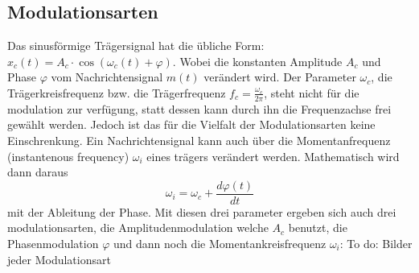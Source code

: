 %
%
%
\subsection{Modulationsarten\label{fm:section:modulation}}

Das sinusförmige Trägersignal hat die übliche Form: 
\(x_c(t) = A_c \cdot \cos(\omega_c(t)+\varphi)\).
Wobei die konstanten Amplitude \(A_c\) und Phase \(\varphi\) vom Nachrichtensignal \(m(t)\) verändert wird.
Der Parameter \(\omega_c\), die Trägerkreisfrequenz bzw. die Trägerfrequenz \(f_c = \frac{\omega_c}{2\pi}\),
steht nicht für die modulation zur verfügung, statt dessen kann durch ihn die Frequenzachse frei gewählt werden.
\newblockpunct
Jedoch ist das für die Vielfalt der Modulationsarten keine Einschrenkung.
Ein Nachrichtensignal kann auch über die Momentanfrequenz (instantenous frequency) \(\omega_i\) eines trägers verändert werden.
Mathematisch wird dann daraus
\[
    \omega_i = \omega_c + \frac{d \varphi(t)}{dt}
\]
mit der Ableitung der Phase\cite{fm:NAT}.
Mit diesen drei parameter ergeben sich auch drei modulationsarten, die Amplitudenmodulation welche \(A_c\) benutzt, 
die Phasenmodulation \(\varphi\) und dann noch die Momentankreisfrequenz \(\omega_i\):
\newline
\newline
To do: Bilder jeder Modulationsart



